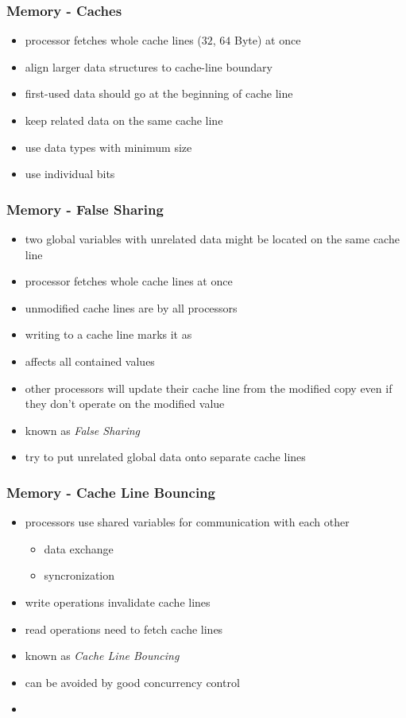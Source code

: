 \begin{frame}
 \frametitle{Memory - Caches}
 \begin{itemize}
  \item processor fetches whole cache lines (\( 32 \), \( 64 \) Byte) at once
  \item align larger data structures to cache-line boundary
  \item first-used data should go at the beginning of cache line
  \item keep related data on the same cache line
  \item use data types with minimum size
  \item use individual bits
 \end{itemize}
\end{frame}

\begin{frame}
 \frametitle{Memory - False Sharing}
 \begin{itemize}
  \item two global variables with unrelated data might be located on the same cache line
  \item processor fetches whole cache lines at once
  \item unmodified cache lines are  by all processors
  \item writing to a cache line marks it as 
  \item affects all contained values
  \item other processors will update their cache line from the modified copy even if they don't operate on the modified value
  \item known as \textit{False Sharing}
  \item try to put unrelated global data onto separate cache lines
 \end{itemize}
\end{frame}

\begin{frame}
 \frametitle{Memory - Cache Line Bouncing}
 \begin{itemize}
  \item processors use shared variables for communication with each other
   \begin{itemize}
    \item data exchange
    \item syncronization
   \end{itemize}
  \item write operations invalidate cache lines
  \item read operations need to fetch cache lines
  \item known as \textit{Cache Line Bouncing}
  \item can be avoided by good concurrency control
  \item {}
 \end{itemize}
\end{frame}

